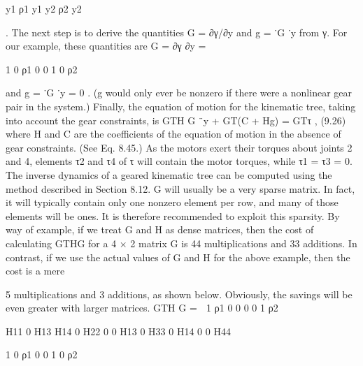 y1 ρ1 y1 y2 ρ2 y2

. The next step is to derive the quantities G = ∂γ/∂y and g = ˙G ˙y from γ. For our example, these quantities are G = ∂γ ∂y =

1 0 ρ1 0 0 1 0 ρ2

and g = ˙G ˙y = 0 . (g would only ever be nonzero if there were a nonlinear gear pair in the system.) Finally, the equation of motion for the kinematic tree, taking into account the gear constraints, is GTH G ¨y + GT(C + Hg) = GTτ , (9.26) where H and C are the coefficients of the equation of motion in the absence of gear constraints. (See Eq. 8.45.) As the motors exert their torques about joints 2 and 4, elements τ2 and τ4 of τ will contain the motor torques, while τ1 = τ3 = 0. The inverse dynamics of a geared kinematic tree can be computed using the method described in Section 8.12. G will usually be a very sparse matrix. In fact, it will typically contain only one nonzero element per row, and many of those elements will be ones. It is therefore recommended to exploit this sparsity. By way of example, if we treat G and H as dense matrices, then the cost of calculating GTHG for a 4 × 2 matrix G is 44 multiplications and 33 additions. In contrast, if we use the actual values of G and H for the above example, then the cost is a mere

5 multiplications and 3 additions, as shown below. Obviously, the savings will be even greater with larger matrices. GTH G =  1 ρ1 0 0 0 0 1 ρ2 

H11 0 H13 H14 0 H22 0 0 H13 0 H33 0 H14 0 0 H44

1 0 ρ1 0 0 1 0 ρ2


